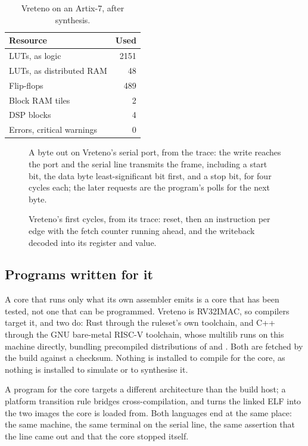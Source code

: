 \documentclass[journal,9pt]{IEEEtran}
\begin{document}
\begin{table}[htbp]
\caption{Vreteno on an Artix-7, after synthesis.}
\label{tab:p-synth}
\centering
\begin{tabular}{@{}lr@{}}
\toprule
Resource & Used \\
\midrule
LUTs, as logic & 2151 \\
LUTs, as distributed RAM & 48 \\
Flip-flops & 489 \\
Block RAM tiles & 2 \\
DSP blocks & 4 \\
Errors, critical warnings & 0 \\
\bottomrule
\end{tabular}
\end{table}

\begin{figure}[htbp]
\centering

\caption{A byte out on Vreteno's serial port, from the trace: the
write reaches the port and the serial line transmits the frame, including a start bit,
the data byte least-significant bit first, and a stop bit, for four cycles each; the later
requests are the program's polls for the next byte.}
\label{fig:p-uart}
\end{figure}

\begin{figure}[htbp]
\centering

\caption{Vreteno's first cycles, from its trace: reset, then an
instruction per edge with the fetch counter running ahead, and the
writeback decoded into its register and value.}
\label{fig:p-vreteno}
\end{figure}

\subsection{Programs written for it}

A core that runs only what its own assembler emits is a core that has
been tested, not one that can be programmed. Vreteno is RV32IMAC, so
compilers target it, and two do: Rust through the ruleset's own
toolchain, and C++ through the GNU bare-metal RISC-V toolchain, whose
 multilib runs on this machine directly, bundling
precompiled distributions of  and . Both are fetched
by the build against a checksum. Nothing is installed to compile for
the core, as nothing is installed to simulate or to synthesise it.

A program for the core targets a different architecture than the
build host; a platform transition rule bridges cross-compilation,
and  turns the linked ELF into the
two images the core is loaded from. Both languages end at the same
place: the same machine, the same terminal on the serial line, the
same assertion that the line came out and that the core stopped
itself.
\end{document}
